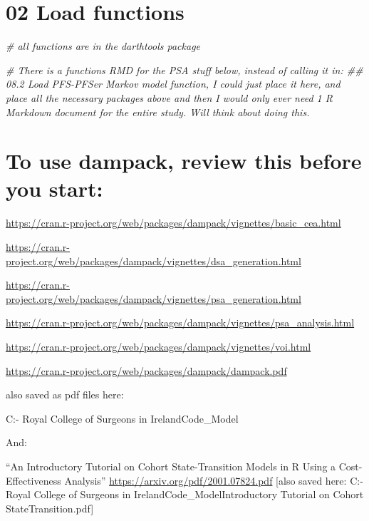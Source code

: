 \documentclass[
]{article}
\newenvironment{Shaded}{\begin{snugshade}}{\end{snugshade}}
\newcommand{\CommentTok}[1]{\textcolor[rgb]{0.56,0.35,0.01}{\textit{#1}}}
\begin{document}
\hypertarget{load-functions}{%
\section{02 Load functions}\label{load-functions}}

\begin{Shaded}
\begin{Highlighting}[]
\CommentTok{\# all functions are in the darthtools package}

\CommentTok{\# There is a functions RMD for the PSA stuff below, instead of calling it in: \#\# 08.2 Load PFS{-}PFSer Markov model function, I could just place it here, and place all the necessary packages above and then I would only ever need 1 R Markdown document for the entire study. Will think about doing this.}
\end{Highlighting}
\end{Shaded}

\hypertarget{to-use-dampack-review-this-before-you-start}{%
\section{To use dampack, review this before you
start:}\label{to-use-dampack-review-this-before-you-start}}

\url{https://cran.r-project.org/web/packages/dampack/vignettes/basic_cea.html}

\url{https://cran.r-project.org/web/packages/dampack/vignettes/dsa_generation.html}

\url{https://cran.r-project.org/web/packages/dampack/vignettes/psa_generation.html}

\url{https://cran.r-project.org/web/packages/dampack/vignettes/psa_analysis.html}

\url{https://cran.r-project.org/web/packages/dampack/vignettes/voi.html}

\url{https://cran.r-project.org/web/packages/dampack/dampack.pdf}

also saved as pdf files here:

C:\Users\Jonathan\OneDrive - Royal College of Surgeons in
Ireland\COLOSSUS\R Code\GitHub\COLOSSUS\_Model

And:

``An Introductory Tutorial on Cohort State-Transition Models in R Using
a Cost-Effectiveness Analysis''
\url{https://arxiv.org/pdf/2001.07824.pdf} {[}also saved here:
C:\Users\Jonathan\OneDrive - Royal College of Surgeons in
Ireland\COLOSSUS\R Code\GitHub\COLOSSUS\_Model\An Introductory Tutorial
on Cohort StateTransition.pdf{]}
\end{document}
